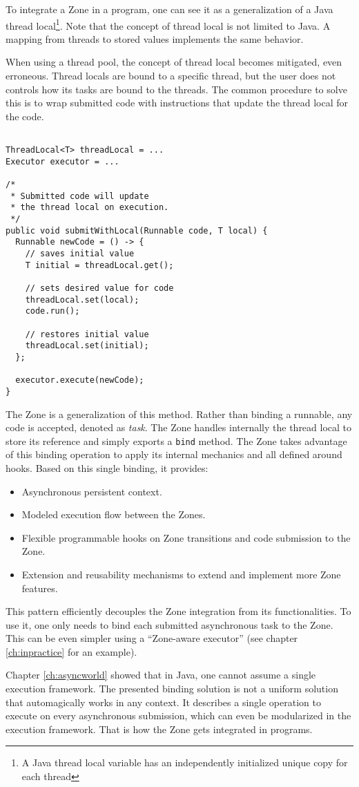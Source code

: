 To integrate a Zone in a program, one can see it as a generalization of a Java thread local\footnote{A Java thread local variable has an independently initialized unique copy for each thread}. Note that the concept of thread local is not limited to Java. A mapping from threads to stored values implements the same behavior.

When using a thread pool, the concept of thread local becomes mitigated, even erroneous. Thread locals are bound to a specific thread, but the user does not controls how its tasks are bound to the threads. The common procedure to solve this is to wrap submitted code with instructions that update the thread local for the code.
\begin{lstlisting}

ThreadLocal<T> threadLocal = ...
Executor executor = ...

/*
 * Submitted code will update
 * the thread local on execution.
 */
public void submitWithLocal(Runnable code, T local) {
  Runnable newCode = () -> {
    // saves initial value
    T initial = threadLocal.get();

    // sets desired value for code
    threadLocal.set(local);
    code.run();

    // restores initial value
    threadLocal.set(initial);
  };

  executor.execute(newCode);
}
\end{lstlisting}

The Zone is a generalization of this method. Rather than binding a runnable, any code is accepted, denoted as \emph{task}. The Zone handles internally the thread local to store its reference and simply exports a \lstinline{bind} method.
The Zone takes advantage of this binding operation to apply its internal mechanics and all defined around hooks. Based on this single binding, it provides:
\begin{itemize}
\item Asynchronous persistent context.
\item Modeled execution flow between the Zones.
\item Flexible programmable hooks on Zone transitions and code submission to the Zone.
\item Extension and reusability mechanisms to extend and implement more Zone features.
\end{itemize}


This pattern efficiently decouples the Zone integration from its functionalities. To use it, one only needs to bind each submitted asynchronous task to the Zone. This can be even simpler using a ``Zone-aware executor'' (see chapter \ref{ch:inpractice} for an example).

Chapter \ref{ch:asyncworld} showed that in Java, one cannot assume a single execution framework. The presented binding solution is not a uniform solution that automagically works in any context. It describes a single operation to execute on every asynchronous submission, which can even be modularized in the execution framework. That is how the Zone gets integrated in programs.

